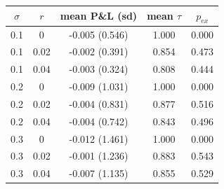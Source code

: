 \begin{tabular}{ccccc}
\toprule
$\sigma$ & $r$ & mean P\&L (sd) & mean $\tau$ & $p_{ex}$ \\
\midrule
0.1 & 0 & -0.005 (0.546) & 1.000 & 0.000 \\
0.1 & 0.02 & -0.002 (0.391) & 0.854 & 0.473 \\
0.1 & 0.04 & -0.003 (0.324) & 0.808 & 0.444 \\
0.2 & 0 & -0.009 (1.031) & 1.000 & 0.000 \\
0.2 & 0.02 & -0.004 (0.831) & 0.877 & 0.516 \\
0.2 & 0.04 & -0.004 (0.742) & 0.843 & 0.496 \\
0.3 & 0 & -0.012 (1.461) & 1.000 & 0.000 \\
0.3 & 0.02 & -0.001 (1.236) & 0.883 & 0.543 \\
0.3 & 0.04 & -0.007 (1.135) & 0.855 & 0.529 \\
\bottomrule
\end{tabular}
